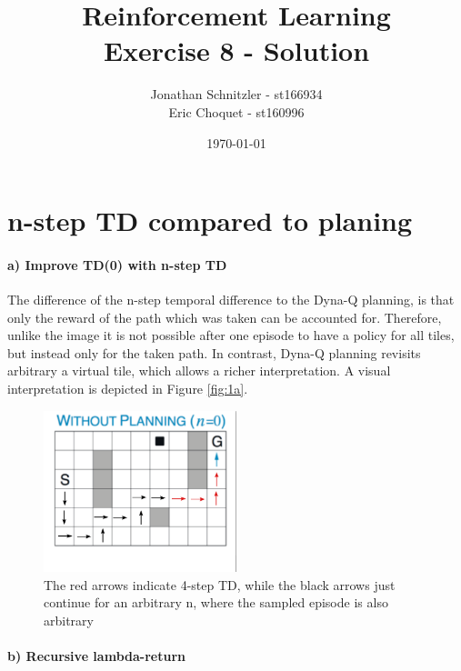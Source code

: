 \documentclass{article}
\title{Reinforcement Learning \\ Exercise 8 - Solution}
\author{Jonathan Schnitzler - st166934 \\
Eric Choquet - st160996}
\date{\today}
\begin{document}
\maketitle

\section{n-step TD compared to planing}

\paragraph*{a) Improve TD(0) with n-step TD}
The difference of the n-step temporal difference to the Dyna-Q planning, is that only the reward of the path which was taken can be accounted for. Therefore, unlike the image it is not possible after one episode to have a policy for all tiles, but instead only for the taken path. In contrast, Dyna-Q planning revisits arbitrary a virtual tile, which allows a richer interpretation. A visual interpretation is depicted in Figure \ref{fig:1a}.

\begin{figure}[H]
\centering
\includegraphics[width=0.5\textwidth]{nstep.png}
\caption{The red arrows indicate 4-step TD, while the black arrows just continue for an arbitrary n, where the sampled episode is also arbitrary}
\label{fig:a1}
\end{figure}

\paragraph*{b) Recursive lambda-return}
\end{document}
